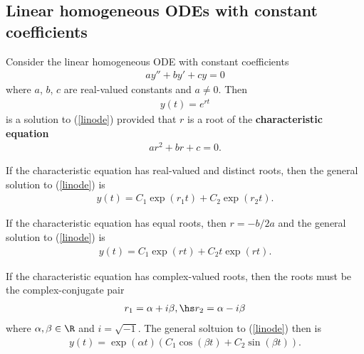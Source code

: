 \documentclass{article}
\begin{document}
\subsection{Linear homogeneous ODEs with constant coefficients}

\begin{theorem}
    Consider the linear homogeneous ODE with constant coefficients
    \begin{align}
        \label{linode}
        ay'' + by' + cy = 0
    \end{align}
    where $a$, $b$, $c$ are real-valued constants and $a\not=0$.
    Then
    \begin{align*}
        y(t)=e^{rt}
    \end{align*}
    is a solution to (\ref{linode}) provided that $r$ is a root of the
    \textbf{characteristic equation}
    \begin{align*}
        ar^2 + br + c = 0.
    \end{align*}
\end{theorem}
\begin{theorem}
    If the characteristic equation has real-valued and distinct roots,
    then the general solution to (\ref{linode}) is
    \begin{align*}
        y(t)=C_1\exp(r_1 t) + C_2 \exp(r_2 t).
    \end{align*}
\end{theorem}
\begin{theorem}
    If the characteristic equation has equal roots, then $r=-b/2a$ and the
    general solution to (\ref{linode}) is
    \begin{align*}
        y(t)=C_1\exp\left(rt\right)+C_2t\exp(rt).
    \end{align*}
\end{theorem}
\begin{theorem}
    If the characteristic equation has complex-valued roots, then the
    roots must be the complex-conjugate pair
    \begin{align*}
        r_1 = \alpha + i\beta,\hs r_2 = \alpha - i\beta
    \end{align*}
    where $\alpha,\beta\in\R$ and $i=\sqrt{-1}$. The general soltuion
    to (\ref{linode}) then is
    \begin{align*}
        y(t) = \exp(\alpha t)\left(C_1 \cos\left(\beta t\right)+C_2\sin\left(\beta t\right)\right).
    \end{align*}
\end{theorem}
\end{document}
